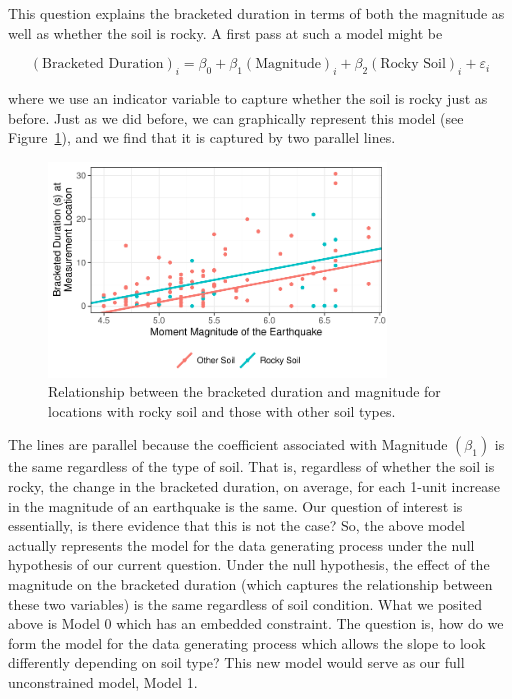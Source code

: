 \documentclass[
  letterpaper,
  DIV=11,
  numbers=noendperiod]{scrreprt}
\theoremstyle{definition}
\theoremstyle{definition}
\theoremstyle{plain}
\theoremstyle{remark}
\begin{document}
This question explains the bracketed duration in terms of both the
magnitude as well as whether the soil is rocky. A first pass at such a
model might be

\[
(\text{Bracketed Duration})_i = \beta_0 + \beta_1(\text{Magnitude})_i + \beta_2(\text{Rocky Soil})_i + \varepsilon_i
\]

where we use an indicator variable to capture whether the soil is rocky
just as before. Just as we did before, we can graphically represent this
model (see Figure~\ref{fig-regextensions-ind-plot2}), and we find that
it is captured by two parallel lines.

\begin{figure}

{\centering \includegraphics[width=0.8\textwidth,height=\textheight]{./images/fig-regextensions-ind-plot2-1.pdf}

}

\caption{\label{fig-regextensions-ind-plot2}Relationship between the
bracketed duration and magnitude for locations with rocky soil and those
with other soil types.}

\end{figure}

The lines are parallel because the coefficient associated with Magnitude
\(\left(\beta_1\right)\) is the same regardless of the type of soil.
That is, regardless of whether the soil is rocky, the change in the
bracketed duration, on average, for each 1-unit increase in the
magnitude of an earthquake is the same. Our question of interest is
essentially, is there evidence that this is not the case? So, the above
model actually represents the model for the data generating process
under the null hypothesis of our current question. Under the null
hypothesis, the effect of the magnitude on the bracketed duration (which
captures the relationship between these two variables) is the same
regardless of soil condition. What we posited above is Model 0 which has
an embedded constraint. The question is, how do we form the model for
the data generating process which allows the slope to look differently
depending on soil type? This new model would serve as our full
unconstrained model, Model 1.
\end{document}
